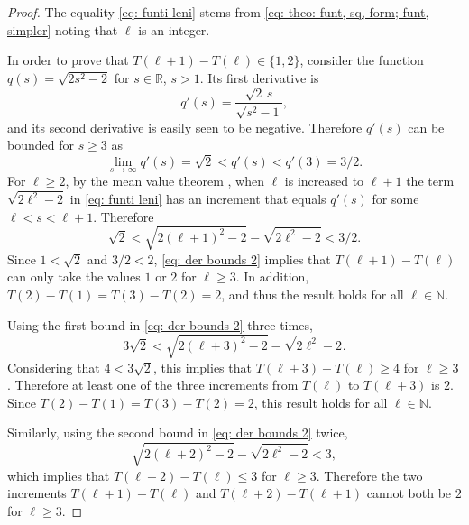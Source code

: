 \documentclass[12pt, a4paper]{article}
\newcommand{\funti}{T} %
\newcommand{\len}{\ell} %
\newcommand{\leni}{\ell} %
\newcommand{\genfun}{q}
\newcommand{\genvar}{s}
\begin{document}
\begin{proof}
The equality \eqref{eq: funti leni} stems from \eqref{eq: theo: funt, sq, form; funt, simpler} noting that $\len$ is an integer.

In order to prove that $\funti(\leni+1)-\funti(\leni) \in \{1,2\}$, consider the function $\genfun(\genvar) = \sqrt{2\genvar^2-2}$ for $\genvar \in \mathbb R$, $\genvar>1$. Its first derivative is
\begin{equation}
\genfun'(\genvar) = \frac {\sqrt{2} \, \genvar} {\sqrt{\genvar^2-1}},
\end{equation}
and its second derivative is easily seen to be negative. Therefore $\genfun'(\genvar)$ can be bounded for $\genvar \geq 3$ as
\begin{equation}
\label{eq: der bounds}
\lim_{\genvar \rightarrow \infty} \genfun'(\genvar) = \sqrt{2} < \genfun'(\genvar) < \genfun'(3) = 3/2.
\end{equation}
For $\leni \geq 2$, by the mean value theorem \cite[section~5.3]{Abbott15}, when $\leni$ is increased to $\leni+1$ the term $\sqrt{2\leni^2-2}$ in \eqref{eq: funti leni} has an increment that equals $\genfun'(\genvar)$ for some $\leni < \genvar < \leni+1$. Therefore
\begin{equation}
\label{eq: der bounds 2}
\sqrt{2} < \sqrt{2(\leni+1)^2-2} - \sqrt{2\leni^2-2} < 3/2.
\end{equation}
Since $1 < \sqrt{2}$ and $3/2 < 2$, \eqref{eq: der bounds 2} implies that $\funti(\leni+1)-\funti(\leni)$ can only take the values $1$ or $2$ for $\leni \geq 3$. In addition, $\funti(2)-\funti(1) = \funti(3)-\funti(2) = 2$, and thus the result holds for all $\leni \in \mathbb N$.

Using the first bound in \eqref{eq: der bounds 2} three times,
\begin{equation}
3\sqrt{2} < \sqrt{2(\leni+3)^2-2} - \sqrt{2\leni^2-2}.
\end{equation}
Considering that $4 < 3\sqrt{2}$, this implies that $\funti(\leni+3)-\funti(\leni) \geq 4$ for $\leni \geq 3$. Therefore at least one of the three increments from $\funti(\leni)$ to $\funti(\leni+3)$ is $2$. Since $\funti(2)-\funti(1) = \funti(3)-\funti(2) = 2$, this result holds for all $\leni \in \mathbb N$.

Similarly, using the second bound in \eqref{eq: der bounds 2} twice,
\begin{equation}
\sqrt{2(\leni+2)^2-2} - \sqrt{2\leni^2-2} < 3,
\end{equation}
which implies that $\funti(\leni+2)-\funti(\leni) \leq 3$ for $\leni \geq 3$. Therefore the two increments $\funti(\leni+1)-\funti(\leni)$ and $\funti(\leni+2)-\funti(\leni+1)$ cannot both be $2$ for $\leni \geq 3$.
\end{proof}
\end{document}
